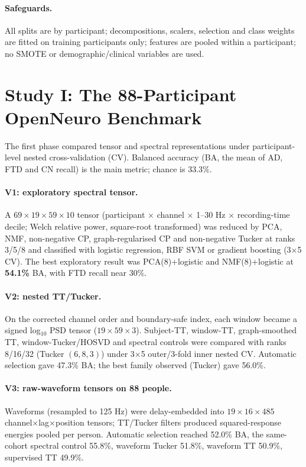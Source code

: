\documentclass[10pt,twocolumn,a4paper]{article}
\begin{document}
\paragraph{Safeguards.} All splits are by participant; decompositions, scalers, selection and class weights are fitted on training participants only; features are pooled within a participant; no SMOTE or demographic/clinical variables are used.

\section{Study I: The 88-Participant OpenNeuro Benchmark}
\label{sec:study1}
The first phase compared tensor and spectral representations under participant-level nested cross-validation (CV). Balanced accuracy (BA, the mean of AD, FTD and CN recall) is the main metric; chance is $33.3\%$.

\paragraph{V1: exploratory spectral tensor.} A $69{\times}19{\times}59{\times}10$ tensor (participant $\times$ channel $\times$ 1--30 Hz $\times$ recording-time decile; Welch relative power, square-root transformed) was reduced by PCA, NMF, non-negative CP, graph-regularised CP and non-negative Tucker at ranks 3/5/8 and classified with logistic regression, RBF SVM or gradient boosting (3$\times$5 CV). The best exploratory result was PCA(8)+logistic and NMF(8)+logistic at \textbf{54.1\%} BA, with FTD recall near $30\%$.

\paragraph{V2: nested TT/Tucker.} On the corrected channel order and boundary-safe index, each window became a signed log$_{10}$ PSD tensor ($19{\times}59{\times}3$). Subject-TT, window-TT, graph-smoothed TT, window-Tucker/HOSVD and spectral controls were compared with ranks 8/16/32 (Tucker $(6,8,3)$) under 3$\times$5 outer/3-fold inner nested CV. Automatic selection gave 47.3\% BA; the best family observed (Tucker) gave 56.0\%.

\paragraph{V3: raw-waveform tensors on 88 people.} Waveforms (resampled to 125 Hz) were delay-embedded into $19{\times}16{\times}485$ channel$\times$lag$\times$position tensors; TT/Tucker filters produced squared-response energies pooled per person. Automatic selection reached 52.0\% BA, the same-cohort spectral control 55.8\%, waveform Tucker 51.8\%, waveform TT 50.9\%, supervised TT 49.9\%.
\end{document}
